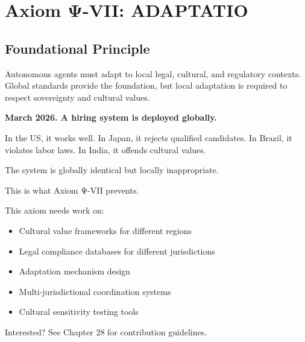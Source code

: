 
\chapter{Axiom Ψ-VII: ADAPTATIO}
\label{ch:axiom-VII}

\section*{Foundational Principle}

\begin{principlebox}
Autonomous agents must adapt to local legal, cultural, and regulatory contexts. Global standards provide the foundation, but local adaptation is required to respect sovereignty and cultural values.
\end{principlebox}

\vspace{0.5cm}

\begin{tcolorbox}[colback=lightgray, colframe=legislativeblue, title=\textbf{📖 Why This Axiom Matters}]
\textbf{March 2026. A hiring system is deployed globally.}

In the US, it works well. In Japan, it rejects qualified candidates. In Brazil, it violates labor laws. In India, it offends cultural values.

The system is globally identical but locally inappropriate.

This is what Axiom Ψ-VII prevents.
\end{tcolorbox}

\vspace{0.5cm}

\begin{tcolorbox}[colback=lightgray, colframe=accentgold, title=\textbf{🎯 Contribution Opportunity}]
This axiom needs work on:
\begin{itemize}
    \item Cultural value frameworks for different regions
    \item Legal compliance databases for different jurisdictions
    \item Adaptation mechanism design
    \item Multi-jurisdictional coordination systems
    \item Cultural sensitivity testing tools
\end{itemize}

Interested? See Chapter 28 for contribution guidelines.
\end{tcolorbox}

